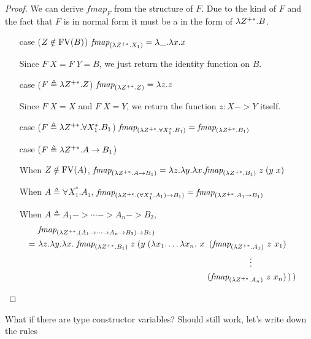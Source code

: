 \begin{proof}
	We can derive $\textit{fmap}_F$ from the structure of $F$.
	Due to the kind of $F$ and the fact that $F$ is in normal form
	it must be a in the form of $\lambda Z^{+*}.B$.
\begin{itemize}
\item[case]($Z\notin \mathop{\mathrm{FV}}(B)$)
	$ \textit{fmap}_{(\lambda Z^{+*}. X_1)} = \lambda \_ . \lambda x. x $

	Since $F\;X = F\;Y = B$, we just return the identity function on $B$.

\item[case]($F \triangleq \lambda Z^{+*}. Z$)
	$ \textit{fmap}_{(\lambda Z^{+*}. Z)} = \lambda z . z $

	Since $F\;X = X$ and $F\;X = Y$,
	we return the function $z:X -> Y$ itself.

\item[case]($F \triangleq \lambda Z^{+*}. \forall X_1^{*} .B_1$)
	$\textit{fmap}_{(\lambda Z^{+*}. \forall X_1^{*} .B_1)}
	= \textit{fmap}_{(\lambda Z^{+*}.B_1)}$

\item[case]($F \triangleq \lambda Z^{+*}. A -> B_1$)

	When $Z\notin\mathop{\mathrm{FV}}(A)$,
	$\textit{fmap}_{(\lambda Z^{+*}.A -> B_1)}
	= \lambda z.\lambda y. \lambda x. \textit{fmap}_{(\lambda Z^{+*}.B_1)} \; z \; (y \; x)$

	When $A \triangleq \forall X_1^{*}.A_1$,
	$\textit{fmap}_{(\lambda Z^{+*}.(\forall X_1^{*}.A_1) -> B_1)}
	= \textit{fmap}_{(\lambda Z^{+*}.A_1 -> B_1)}$

	\begin{singlespace}
	When $A \triangleq A_1 -> \cdots -> A_n -> B_2$,
	\begin{align*}
	  & \textit{fmap}_{(\l Z^{+*}.(A_1 -> \cdots -> A_n -> B_2) -> B_1)} \\
	=~& \l z.\l y. \l x.\;
	\textit{fmap}_{(\l Z^{+*}.B_1)} \; z \;
		(y \; (\l x_1.\ldots\l x_n. ~
		   x  &\!\!\!\!(\textit{fmap}_{(\l Z^{+*}.A_1)} ~ z ~ x_1)& \\
		     &&\!\!\!\!\vdots \qquad\qquad& \\
		     &&\!\!\!\!(\textit{fmap}_{(\l Z^{+*}.A_n)} ~ z ~ x_n)&
		\,) \,)
	\end{align*}
	\end{singlespace}

\end{itemize}
\end{proof}

What if there are type constructor variables?
Should still work, let's write down the rules

